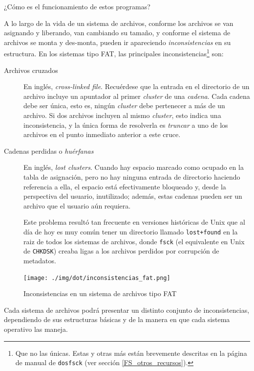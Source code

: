 \documentclass[11pt,fleqn]{book} %
\begin{document}
¿Cómo es el funcionamiento de estos programas?

A lo largo de la vida de un sistema de archivos, conforme los archivos
se van asignando y liberando, van cambiando su tamaño, y conforme el
sistema de archivos se monta y des-monta, pueden ir apareciendo
\emph{inconsistencias} en su estructura. En los sistemas tipo FAT, las
principales inconsistencias\footnote{Que no las únicas. Estas y otras más
están brevemente descritas en la página de manual de \texttt{dosfsck} (ver
sección \ref{FS_otros_recursos}). } son:

\begin{description}
\item[Archivos cruzados] En inglés, \emph{cross-linked file}. Recuérdese que
     la entrada en el directorio de un archivo incluye un apuntador al
     primer \emph{cluster} de una \emph{cadena}. Cada cadena debe ser única,
     esto es, ningún \emph{cluster} debe pertenecer a más de un
     archivo. Si dos archivos incluyen al mismo \emph{cluster}, esto
     indica una inconsistencia, y la única forma de resolverla es
     \emph{truncar} a uno de los archivos en el punto inmediato anterior a
     este cruce.
\item[Cadenas perdidas o \emph{huérfanas}] En inglés, \emph{lost clusters}. Cuando
     hay espacio marcado como ocupado en la tabla de asignación, pero
     no hay ninguna entrada de directorio haciendo referencia a ella,
     el espacio está efectivamente bloqueado y, desde la perspectiva
     del usuario, inutilizado; además, estas cadenas pueden ser un
     archivo que el usuario aún requiera.

     Este problema resultó tan frecuente en versiones históricas de
     Unix que al día de hoy es muy común tener un directorio llamado
     \texttt{lost+found} en la raiz de todos los sistemas de archivos, donde
     \texttt{fsck} (el equivalente en Unix de \texttt{CHKDSK}) creaba ligas a los
     archivos perdidos por corrupción de metadatos.
\end{description}

\begin{figure}[htb]
\centering
\texttt{[image: ./img/dot/inconsistencias\_fat.png]}
\caption{\label{FS_inconsistencias_fat}Inconsistencias en un sistema de archivos tipo FAT}
\end{figure}

Cada sistema de archivos podrá presentar un distinto conjunto de
inconsistencias, dependiendo de sus estructuras
básicas y de la manera en que cada sistema operativo las maneja.
\end{document}

